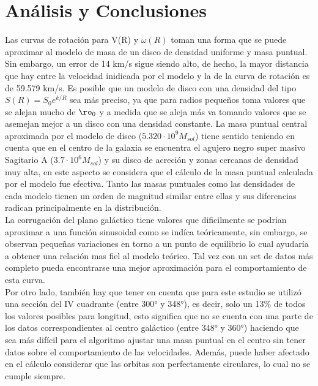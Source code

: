 \documentclass[letterpaper,oneside]{article}
\begin{document}
\section{Análisis y Conclusiones}
Las curvas de rotación para V(R) y $\omega(R)$ toman una forma que se puede aproximar al modelo de masa de un disco de densidad uniforme y masa puntual. Sin embargo, un error de 14 km/s sigue siendo alto, de hecho, la mayor distancia que hay entre la velocidad inidicada por el modelo y la de la curva de rotación es de 59.579 km/s. Es posible que un modelo de disco con una densidad del tipo $S(R) = S_0e^{k/R}$ sea más preciso, ya que para radios pequeños toma valores que se alejan mucho de $\ro_0$ y a medida que se aleja más va tomando valores que se asemejan mejor a un disco con una densidad constante. La masa puntual central aproximada por el modelo de disco ($5.320 \cdot 10^{9} M_{sol}$) tiene sentido teniendo en cuenta que en el centro de la galaxia se encuentra el agujero negro super masivo Sagitario A ($3.7 \cdot 10^{6} M_{sol}$) y su disco de acreción y zonas cercanas de densidad muy alta, en este aspecto se considera que el cálculo de la masa puntual calculada por el modelo fue efectiva.  Tanto las masas puntuales como las densidades de cada modelo tienen un orden de magnitud similar entre ellas y sus diferencias radican principalmente en la distribución.\\

La corrugación del plano galáctico tiene valores que dificilmente se podrian aproximar a una función sinusoidal como se indíca teóricamente, sin embargo, se observan pequeñas variaciones en torno a un punto de equilibrio lo cual ayudaría a obtener una relación mas fiel al modelo teórico. Tal vez con un set de datos más completo pueda encontrarse una mejor aproximación para el comportamiento de esta curva.\\

Por otro lado, también hay que tener en cuenta que para este estudio se utilizó una sección del \textrm{IV} cuadrante (entre 300° y 348°), es decir, solo un 13\% de todos los valores posibles para longitud, esto significa que no se cuenta con una parte de los datos correspondientes al centro galáctico (entre 348° y 360°) haciendo que sea más difícil para el algoritmo ajustar una masa puntual en el centro sin tener datos sobre el comportamiento de las velocidades. Además, puede haber afectado en el cálculo considerar que las orbitas son perfectamente circulares, lo cual no se cumple siempre.\\
\end{document}

